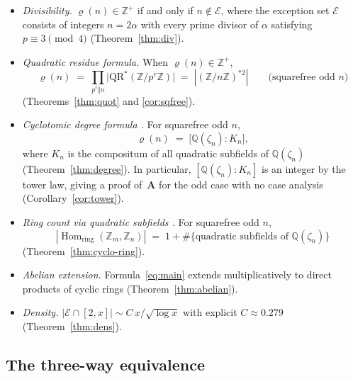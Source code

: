 \documentclass[12pt]{amsart}
\theoremstyle{bluehead}
\theoremstyle{orangehead}
\theoremstyle{greenhead}
\newcommand{\Z}{\mathbb{Z}}
\newcommand{\Q}{\mathbb{Q}}
\newcommand{\QRS}{\mathrm{QR}^{*}}
\newcommand{\Hring}{\operatorname{Hom}_{\mathrm{ring}}}
\newcommand{\Exc}{\mathcal{E}}
\begin{document}
\begin{itemize}[leftmargin=2.5em,itemsep=4pt]
  \item[\textbf{A.}] \emph{Divisibility.}\enspace
    $\varrho(n)\in\Z^+$ if and only if $n\notin\Exc$, where
    the exception set $\Exc$ consists of integers $n=2\alpha$
    with every prime divisor of $\alpha$ satisfying $p\equiv3\pmod4$
    (Theorem~\ref{thm:div}).

  \item[\textbf{B.}] \emph{Quadratic residue formula.}\enspace
    When $\varrho(n)\in\Z^+$,
    \begin{equation}\label{eq:main}
      \varrho(n)\;=\;\prod_{p^r\Vert n}\bigl|\QRS(\Z/p^r\Z)\bigr|
      \;=\;|(\Z/n\Z)^{*2}|
      \qquad\text{(squarefree odd $n$)}
    \end{equation}
    (Theorems~\ref{thm:quot} and \ref{cor:sqfree}).

  \item[\textbf{C.}] \emph{Cyclotomic degree formula \upshape[new].}\enspace
    For squarefree odd $n$,
    \begin{equation}\label{eq:degree}
      \varrho(n)\;=\;\bigl[\Q(\zeta_n):K_n\bigr],
    \end{equation}
    where $K_n$ is the compositum of all quadratic subfields of $\Q(\zeta_n)$
    (Theorem~\ref{thm:degree}).
    In particular, $[\Q(\zeta_n):K_n]$ is an integer by the tower law,
    giving a proof of~\textbf{A} for the odd case with no case analysis
    (Corollary~\ref{cor:tower}).

  \item[\textbf{D.}] \emph{Ring count via quadratic subfields \upshape[new].}\enspace
    For squarefree odd $n$,
    \[
      |\Hring(\Z_m,\Z_n)|\;=\;1+\#\bigl\{\text{quadratic subfields of }\Q(\zeta_n)\bigr\}
    \]
    (Theorem~\ref{thm:cyclo-ring}).

  \item[\textbf{E.}] \emph{Abelian extension.}\enspace
    Formula~\eqref{eq:main} extends multiplicatively to direct products
    of cyclic rings (Theorem~\ref{thm:abelian}).

  \item[\textbf{F.}] \emph{Density.}\enspace
    $|\Exc\cap[2,x]|\sim C\,x/\!\sqrt{\log x}$
    with explicit $C\approx0.279$ (Theorem~\ref{thm:dens}).
\end{itemize}

\subsection*{The three-way equivalence}
\end{document}
